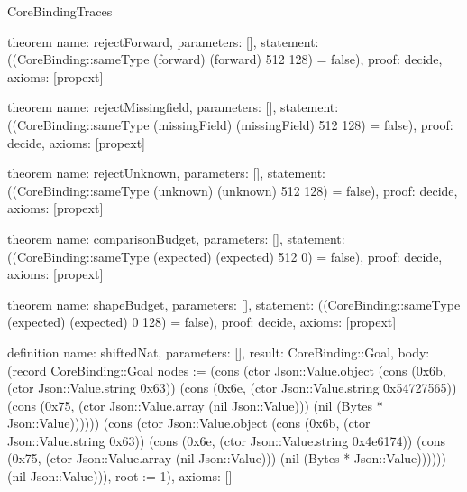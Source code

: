 \begin{lexlean}{CoreBindingTraces}
\begin{semanticmodule}
theorem{
 name: rejectForward,
 parameters: [],
 statement: ((CoreBinding::sameType (forward) (forward) 512 128) = false),
 proof: decide{},
 axioms: [propext]
}

theorem{
 name: rejectMissingfield,
 parameters: [],
 statement: ((CoreBinding::sameType (missingField) (missingField) 512 128) = false),
 proof: decide{},
 axioms: [propext]
}

theorem{
 name: rejectUnknown,
 parameters: [],
 statement: ((CoreBinding::sameType (unknown) (unknown) 512 128) = false),
 proof: decide{},
 axioms: [propext]
}

theorem{
 name: comparisonBudget,
 parameters: [],
 statement: ((CoreBinding::sameType (expected) (expected) 512 0) = false),
 proof: decide{},
 axioms: [propext]
}

theorem{
 name: shapeBudget,
 parameters: [],
 statement: ((CoreBinding::sameType (expected) (expected) 0 128) = false),
 proof: decide{},
 axioms: [propext]
}

definition{
 name: shiftedNat,
 parameters: [],
 result: CoreBinding::Goal,
 body: (record CoreBinding::Goal {nodes := (cons (ctor Json::Value.object (cons (0x6b, (ctor Json::Value.string 0x63)) (cons (0x6e, (ctor Json::Value.string 0x54727565)) (cons (0x75, (ctor Json::Value.array (nil Json::Value))) (nil (Bytes * Json::Value)))))) (cons (ctor Json::Value.object (cons (0x6b, (ctor Json::Value.string 0x63)) (cons (0x6e, (ctor Json::Value.string 0x4e6174)) (cons (0x75, (ctor Json::Value.array (nil Json::Value))) (nil (Bytes * Json::Value)))))) (nil Json::Value))), root := 1}),
 axioms: []
}


\end{semanticmodule}
\end{lexlean}
